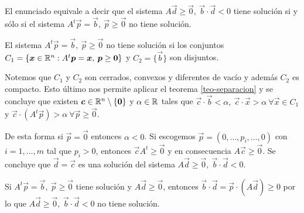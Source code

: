 \begin{demostracion}
El enunciado equivale a decir que el sistema $A\vec{d}\geq \vec{0},\:\vec{b}\cdot \vec{d} < 0$ tiene soluci\'on si y s\'olo si el sistema $A^t \vec{p} = \vec{b},\:\vec{p}\geq \vec{0}$ no tiene soluci\'on. 

El sistema $A^t \vec{p} = \vec{b},\:\vec{p}\geq \vec{0}$ no tiene soluci\'on si los conjuntos $C_1=\{\boldsymbol{x}\in \mathbb{R}^n : A^t \boldsymbol{p} = \boldsymbol{x},\:\boldsymbol{p}\geq \boldsymbol{0}\}$ y $C_2=\{\vec{b}\}$ son disjuntos. 

Notemos que $C_1$ y $C_2$ son cerrados, convexos y diferentes de vac\'io y adem\'as $C_2$ es compacto. Esto \'ultimo nos permite aplicar el teorema \ref{teo-separacion} y se concluye que existen $\boldsymbol{c}\in \mathbb{R}^n\setminus \{\boldsymbol{0}\}$ y $\alpha \in \mathbb{R}$ tales que $\vec{c}\cdot \vec{b} < \alpha,\:\vec{c}\cdot \vec{x} > \alpha\:\forall \vec{x}\in C_1$ y  $\vec{c}\cdot (A^t \vec{p}) > \alpha \:\forall \vec{p}\geq \vec{0}$.

De esta forma si $\vec{p}=\vec{0}$ entonces $\alpha < 0$. Si escogemos $\vec{p}=(0,\ldots,p_i,\ldots,0)$ con $i=1,\ldots,m$ tal que $p_i > 0$, entonces $\vec{c} A^t \geq \vec{0}$ y en consecuencia $A\vec{c} \geq \vec{0}$. Se concluye que $\vec{d}=\vec{c}$ es una soluci\'on del sistema $A\vec{d} \geq \vec{0},\:\vec{b}\cdot \vec{d} < 0$. 

Si $A^t \vec{p} = \vec{b},\:\vec{p}\geq \vec{0}$ tiene soluci\'on y $A\vec{d} \geq \vec{0}$, entonces $\vec{b}\cdot \vec{d} = \vec{p}\cdot (A\vec{d})\geq 0$ por lo que $A\vec{d} \geq \vec{0},\:\vec{b}\cdot \vec{d} < 0$ no tiene soluci\'on.
\end{demostracion}


